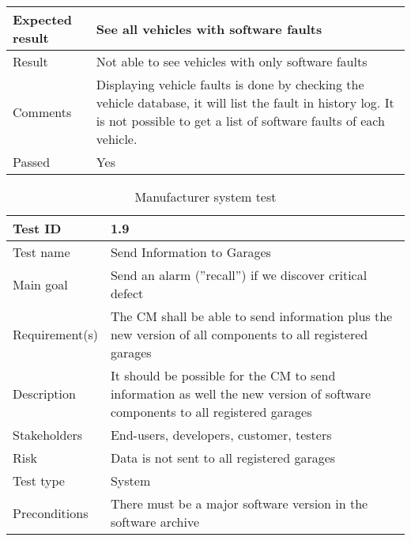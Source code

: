 \begin{table}[H]
\begin{tabularx}{1.0\textwidth}{
    |p{}     %
    |p{}|    %
}
Expected result
& See all vehicles with software faults
\\
\hline

Result
& Not able to see vehicles with only software faults
\\
\hline

Comments
& Displaying vehicle faults is done by checking the vehicle database, it will list the fault in history log. It is not possible to get a list of software faults of each vehicle.
\\
\hline

Passed
& Yes
\\
\hline

\end{tabularx}
\end{table}

\begin{table}[H]
\centering
\caption{Manufacturer system test}
\begin{tabularx}{1.0\textwidth}{
    |p{}     %
    |p{}|    %
}
\hline

Test ID
& 1.9
\\
\hline

Test name
& Send Information to Garages
\\
\hline

Main goal
& Send an alarm (”recall”) if we discover critical defect
\\
\hline

Requirement(s)
& The CM shall be able to send information plus the new version of all components to all registered garages
\\
\hline

Description
& It should be possible for the CM to send information as well the new version of software components to all registered garages
\\
\hline

Stakeholders
& End-users, developers, customer, testers
\\
\hline

Risk
& Data is not sent to all registered garages
\\
\hline

Test type
& System
\\
\hline

Preconditions
& There must be a major software version in the software archive
\\
\hline


\end{tabularx}
\end{table}
